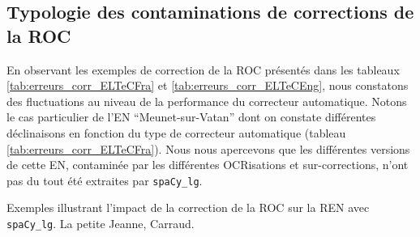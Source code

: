 \subsection{Typologie des contaminations de corrections de la ROC}
\label{subsec:Typologie_COR-OCR-IMPACT-NER}

En observant les exemples de correction de la ROC présentés dans les tableaux \ref{tab:erreurs_corr_ELTeCFra} et \ref{tab:erreurs_corr_ELTeCEng}, nous constatons des fluctuations au niveau de la performance du correcteur automatique.
Notons le cas particulier de l'EN ``Meunet-sur-Vatan'' dont on constate différentes déclinaisons en fonction du type de correcteur automatique (tableau \ref{tab:erreurs_corr_ELTeCFra}). Nous nous apercevons que les différentes versions de cette EN, contaminée par les différentes OCRisations et sur-corrections, n'ont pas du tout été extraites par \texttt{spaCy\_lg}.

\begin{table}[h!]
    \footnotesize
    \centering
   
     \caption{Exemples illustrant l'impact de la correction de la ROC sur la REN avec \texttt{spaCy\_lg}. {\normalfont La petite Jeanne}, Carraud.}
    \label{tab:erreurs_corr_ELTeCFra}
\end{table}

